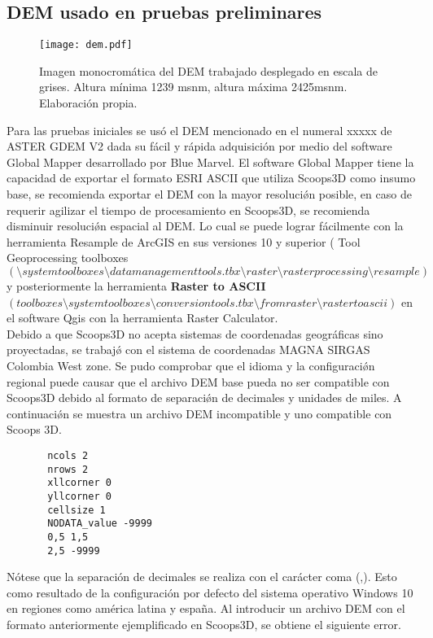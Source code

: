 \subsection{DEM usado en pruebas preliminares}

\begin{figure}[H]
\centering
\texttt{[image: dem.pdf]}
\caption{Imagen monocrom\'atica del DEM trabajado desplegado en escala de grises. Altura m\'inima 1239 msnm, altura m\'axima 2425msnm. Elaboraci\'on propia.}
\label{fig:dem usado}
\end{figure}


Para las pruebas iniciales se us\'o el DEM mencionado en el numeral xxxxx de ASTER
GDEM V2 dada su f\'acil y r\'{a}pida adquisici\'on por medio del software Global Mapper
desarrollado por Blue Marvel.
El software Global Mapper tiene la capacidad de exportar el formato ESRI ASCII que utiliza
Scoops3D como insumo base, se recomienda exportar el DEM con la mayor resoluci\'{\o}n
posible, en caso de requerir agilizar el tiempo de procesamiento en Scoops3D, se
recomienda disminuir resoluci\'{\o}n espacial al DEM. Lo cual se puede lograr f\'{a}cilmente con la
herramienta Resample de ArcGIS en sus versiones 10 y superior (
Tool Geoprocessing
toolboxes $ (\setminus system toolboxes \setminus data management tools.tbx \setminus raster \setminus raster processing \setminus resample)$ y posteriormente la
herramienta \textbf{Raster to ASCII} $(toolboxes \setminus system toolboxes \setminus conversion tools.tbx \setminus from raster \setminus raster to ascii)$ en el software Qgis con la
herramienta Raster Calculator.\\
Debido a que Scoops3D no acepta sistemas de coordenadas geogr\'{a}ficas sino proyectadas,
se trabaj\'{\o} con el sistema de coordenadas MAGNA SIRGAS Colombia West zone. 
Se pudo comprobar que el idioma y la configuraci\'{\o}n regional puede causar que el archivo
DEM base pueda no ser compatible con Scoops3D debido al formato de separaci\'{\o}n de
decimales y unidades de miles. A continuaci\'{\o}n se muestra un archivo DEM incompatible y
uno compatible con Scoops 3D.

\begin{verbatim}
	   ncols 2
	   nrows 2
	   xllcorner 0
	   yllcorner 0
	   cellsize 1
	   NODATA_value -9999
	   0,5 1,5
	   2,5 -9999
\end{verbatim}

N\'{o}tese que la separaci\'{o}n de decimales se realiza con el car\'{a}cter coma (,). Esto como
resultado de la configuraci\'{o}n por defecto del sistema operativo Windows 10 en regiones
como am\'{e}rica latina y espa\~na.
Al introducir un archivo DEM con el formato anteriormente ejemplificado en Scoops3D, se
obtiene el siguiente error.


